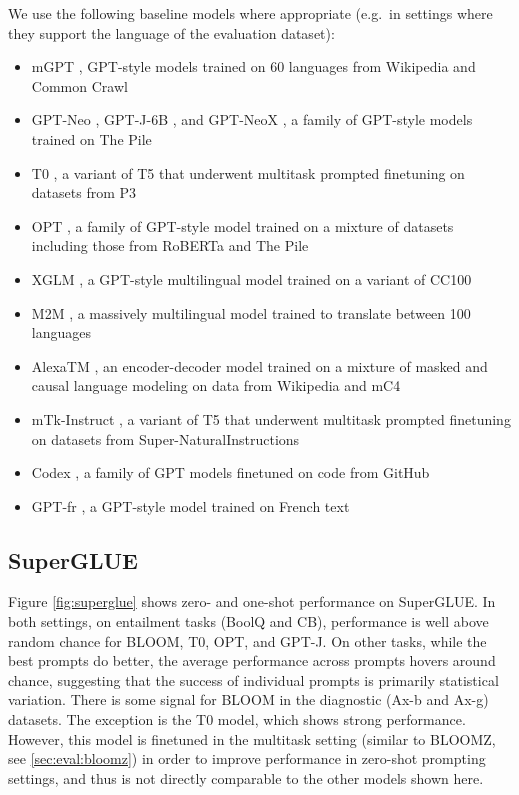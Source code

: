 We use the following baseline models where appropriate (e.g.\ in settings where they support the language of the evaluation dataset):

\begin{itemize}
    \item mGPT \citep{shliazhko2022mgpt}, GPT-style models trained on 60 languages from Wikipedia and Common Crawl \item GPT-Neo \citep{black2021gpt}, GPT-J-6B \citep{wang2021gpt}, and GPT-NeoX \citep{black2022gpt}, a family of GPT-style models trained on The Pile \citep{gao2020pile}
    \item T0 \citep{sanh2022multitask}, a variant of T5 \citep{raffel2020exploring} that underwent multitask prompted finetuning on datasets from P3 \citep{bach2022promptsource}
    \item OPT \citep{zhang2022opt}, a family of GPT-style model trained on a mixture of datasets including those from RoBERTa \cite{liu2019roberta} and The Pile \citep{gao2020pile}
    \item XGLM \citep{lin2021xglm}, a GPT-style multilingual model trained on a variant of CC100 \citep{conneau2020unsupervised}
    \item M2M \citep{fan-etal-2021-beyond}, a massively multilingual model trained to translate between 100 languages \item AlexaTM \citep{soltan-etal-2022-alexatm}, an encoder-decoder model trained on a mixture of masked and causal language modeling on data from Wikipedia and mC4 \citep{xue2021mt5}
    \item mTk-Instruct \citep{wang2022benchmarking}, a variant of T5 that underwent multitask prompted finetuning on datasets from Super-NaturalInstructions
    \item Codex \citep{chen2021evaluating}, a family of GPT models finetuned on code from GitHub \item GPT-fr \citep{simoulin:hal-03265900}, a GPT-style model trained on French text
\end{itemize}

\subsection{SuperGLUE}
\label{sec:eval:superglue}

Figure \ref{fig:superglue} shows zero- and one-shot performance on SuperGLUE. In both settings, on entailment tasks (BoolQ and CB), performance is well above random chance for BLOOM, T0, OPT, and GPT-J. On other tasks, while the best prompts do better, the average performance across prompts hovers around chance, suggesting that the success of individual prompts is primarily statistical variation. There is some signal for BLOOM in the diagnostic (Ax-b and Ax-g) datasets. The exception is the T0 model, which shows strong performance. However, this model is finetuned in the multitask setting (similar to BLOOMZ, see \ref{sec:eval:bloomz}) in order to improve performance in zero-shot prompting settings, and thus is not directly comparable to the other models shown here. 

